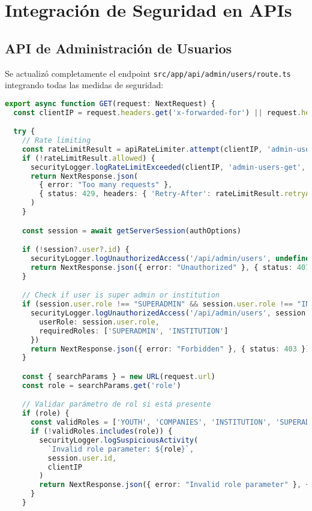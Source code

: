 \documentclass[12pt,a4paper]{article}
\begin{document}
\section{Integración de Seguridad en APIs}

\subsection{API de Administración de Usuarios}

Se actualizó completamente el endpoint \texttt{src/app/api/admin/users/route.ts} integrando todas las medidas de seguridad:

\begin{lstlisting}[language=TypeScript, caption=API con Seguridad Integrada]
export async function GET(request: NextRequest) {
  const clientIP = request.headers.get('x-forwarded-for') || request.headers.get('x-real-ip') || 'unknown'

  try {
    // Rate limiting
    const rateLimitResult = apiRateLimiter.attempt(clientIP, 'admin-users-get')
    if (!rateLimitResult.allowed) {
      securityLogger.logRateLimitExceeded(clientIP, 'admin-users-get', clientIP)
      return NextResponse.json(
        { error: "Too many requests" },
        { status: 429, headers: { 'Retry-After': rateLimitResult.retryAfter?.toString() || '300' } }
      )
    }

    const session = await getServerSession(authOptions)

    if (!session?.user?.id) {
      securityLogger.logUnauthorizedAccess('/api/admin/users', undefined, clientIP)
      return NextResponse.json({ error: "Unauthorized" }, { status: 401 })
    }

    // Check if user is super admin or institution
    if (session.user.role !== "SUPERADMIN" && session.user.role !== "INSTITUTION") {
      securityLogger.logUnauthorizedAccess('/api/admin/users', session.user.id, clientIP, {
        userRole: session.user.role,
        requiredRoles: ['SUPERADMIN', 'INSTITUTION']
      })
      return NextResponse.json({ error: "Forbidden" }, { status: 403 })
    }

    const { searchParams } = new URL(request.url)
    const role = searchParams.get('role')

    // Validar parámetro de rol si está presente
    if (role) {
      const validRoles = ['YOUTH', 'COMPANIES', 'INSTITUTION', 'SUPERADMIN']
      if (!validRoles.includes(role)) {
        securityLogger.logSuspiciousActivity(
          `Invalid role parameter: ${role}`,
          session.user.id,
          clientIP
        )
        return NextResponse.json({ error: "Invalid role parameter" }, { status: 400 })
      }
    }


\end{lstlisting}
\end{document}
